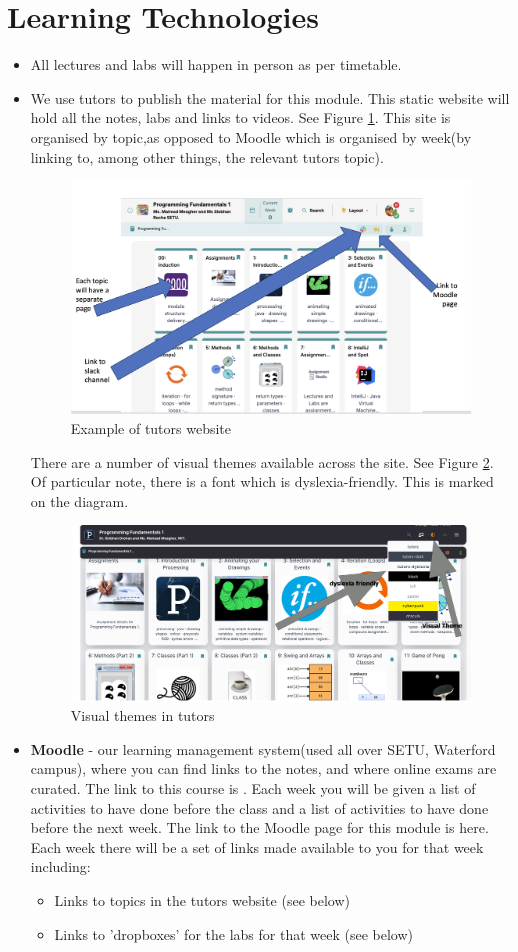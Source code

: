 \documentclass{article}
\begin{document}
\section{Learning Technologies}
\begin{itemize}
\item All lectures and labs  will happen in person as per timetable.
\item We use tutors to publish the material for this  module. This static website will hold all the notes, labs and links to videos.  See Figure \ref{tutors}.
This site is organised by topic,as opposed to Moodle which is organised by week(by linking to, among other things,  the relevant tutors topic).
\begin{figure}[h]
\centering
\includegraphics[width=.6\textwidth]{img/proc-tutors.png}
\caption{Example of tutors website}
\label{tutors}
\end{figure}

There are a number of visual themes available across the site.  See Figure \ref{visual}.
Of particular note, there is a font which is dyslexia-friendly. This is marked on the diagram. 
\begin{figure}[h]
\centering
\includegraphics[width=.6\textwidth]{img/v-theme.png}
\caption{Visual themes in tutors}
\label{visual}
\end{figure}
\item \textbf{Moodle} - our learning management system(used all over SETU, Waterford campus), 
where you can find links to the notes, and where online exams are curated. The link to this course is .  
Each week you will be given a list of activities to have done before the class and 
a list of activities to have done before the next week. 
The link to the Moodle page for this module is 
 {here}.  \\
Each week there will be a set of links made available to you for that week including: 
\begin{itemize}
    \item Links to topics in the tutors website (see below)
    \item Links to 'dropboxes' for the labs for that week (see below)


\end{itemize}
\end{itemize}
\end{document}
